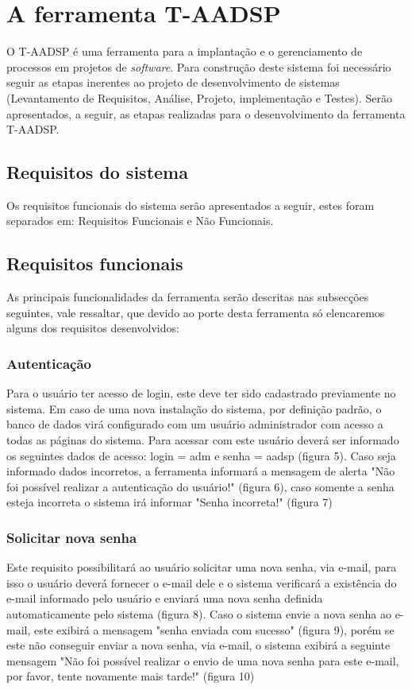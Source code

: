 \documentclass{acm_proc_article-sp}
\begin{document}
\section{A ferramenta T-AADSP}
O T-AADSP é uma ferramenta para a implantação e o gerenciamento de processos em projetos de \textit{software}. Para construção deste sistema foi necessário seguir as etapas inerentes ao projeto de desenvolvimento de sistemas (Levantamento de Requisitos, Análise, Projeto, implementação e Testes).
Serão apresentados, a seguir, as etapas realizadas para o desenvolvimento da ferramenta T-AADSP.

\subsection{Requisitos do sistema}
Os requisitos funcionais do sistema serão apresentados a seguir, estes foram separados em: Requisitos Funcionais e Não Funcionais.

\subsection{Requisitos funcionais}
As principais funcionalidades da ferramenta serão descritas
nas subsecções seguintes, vale ressaltar, que devido ao porte desta ferramenta só elencaremos alguns dos requisitos desenvolvidos:

\subsubsection{Autenticação}
Para o usuário ter acesso de login, este deve ter sido cadastrado previamente no sistema. Em caso de uma nova instalação do sistema, por definição padrão, o banco de dados virá configurado com um usuário administrador com acesso a todas as páginas do sistema. Para acessar com este usuário deverá ser informado os seguintes dados de acesso: login = adm e senha = aadsp (figura 5). Caso seja informado dados incorretos, a ferramenta informará a mensagem de alerta "Não foi possível realizar a autenticação do usuário!" (figura 6), caso somente a senha esteja incorreta o sistema irá informar "Senha incorreta!" (figura 7)

\subsubsection{Solicitar nova senha}
Este requisito possibilitará ao usuário solicitar uma nova senha, via e-mail, para isso o usuário deverá fornecer o e-mail dele e o sistema verificará a existência do e-mail informado pelo usuário e enviará uma nova senha definida automaticamente pelo sistema (figura 8). Caso o sistema envie a nova senha ao e-mail, este exibirá a mensagem "senha enviada com sucesso" (figura 9), porém se este não conseguir enviar a nova senha, via e-mail, o sistema exibirá a seguinte mensagem "Não foi possível realizar o envio de uma nova senha para este e-mail, por favor, tente novamente mais tarde!" (figura 10)
\end{document}
